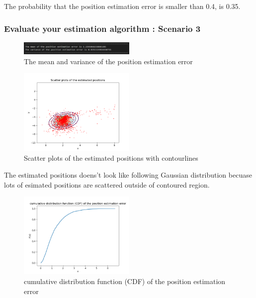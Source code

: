 \documentclass[a4paper]{article}
\begin{document}
The probability that the position estimation error is smaller than 0.4, is 0.35.




\clearpage
\subsubsection{Evaluate your estimation algorithm : Scenario 3}
\begin{figure}[h]
	\begin{center}
		\includegraphics[width=0.5\textwidth]{mean_variance_error3.jpg}
		\caption{The mean and variance of the position estimation error}
	\end{center}
\end{figure}
\begin{figure}[h]
	\begin{center}
		\includegraphics[width=0.5\textwidth]{plotcon3.png}
		\caption{Scatter plots of the estimated positions with contourlines}
	\end{center}
\end{figure}
The estimated positions doens't look like following Gaussian distribution becuase lots of esimated positions are scattered outside of contoured region.
\begin{figure}[h]
	\begin{center}		
		\includegraphics[width=0.5\textwidth]{CDF3.png}
		\caption{cumulative distribution function (CDF) of the position estimation error}
	\end{center}
\end{figure}
\end{document}
